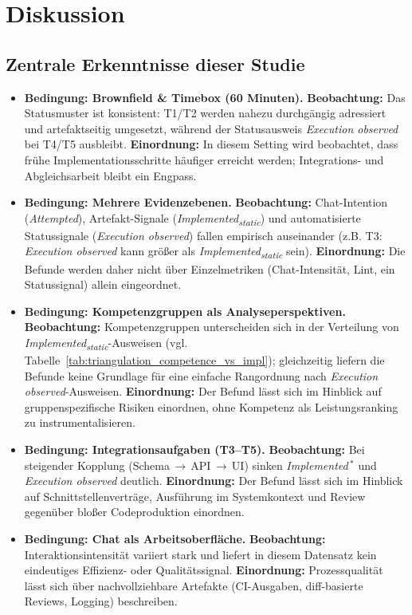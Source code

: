 \chapter{Diskussion}
\label{chap:discussion}

\section{Zentrale Erkenntnisse dieser Studie}
\label{sec:discussion_core_findings}

\begin{itemize}
	\item \textbf{Bedingung: Brownfield \& Timebox (60 Minuten).} \textbf{Beobachtung:} Das Statusmuster ist konsistent: T1/T2 werden nahezu durchg\"angig adressiert und artefaktseitig umgesetzt, w\"ahrend der Statusausweis \textit{Execution observed} bei T4/T5 ausbleibt. \textbf{Einordnung:} In diesem Setting wird beobachtet, dass fr\"uhe Implementationsschritte h\"aufiger erreicht werden; Integrations- und Abgleichsarbeit bleibt ein Engpass.
	\item \textbf{Bedingung: Mehrere Evidenzebenen.} \textbf{Beobachtung:} Chat-Intention (\textit{Attempted}), Artefakt-Signale (\textit{Implemented\textsubscript{static}}) und automatisierte Statussignale (\textit{Execution observed}) fallen empirisch auseinander (z.B. T3: \textit{Execution observed} kann gr\"o\ss er als \textit{Implemented\textsubscript{static}} sein). \textbf{Einordnung:} Die Befunde werden daher nicht \"uber Einzelmetriken (Chat-Intensit\"at, Lint, ein Statussignal) allein eingeordnet.
	\item \textbf{Bedingung: Kompetenzgruppen als Analyseperspektiven.} \textbf{Beobachtung:} Kompetenzgruppen unterscheiden sich in der Verteilung von \textit{Implemented\textsubscript{static}}-Ausweisen (vgl. Tabelle~\ref{tab:triangulation_competence_vs_impl}); gleichzeitig liefern die Befunde keine Grundlage f\"ur eine einfache Rangordnung nach \textit{Execution observed}-Ausweisen. \textbf{Einordnung:} Der Befund l\"asst sich im Hinblick auf gruppenspezifische Risiken einordnen, ohne Kompetenz als Leistungsranking zu instrumentalisieren.
	\item \textbf{Bedingung: Integrationsaufgaben (T3--T5).} \textbf{Beobachtung:} Bei steigender Kopplung (Schema\,$\rightarrow$\,API\,$\rightarrow$\,UI) sinken \textit{Implemented}\,$^\ast$ und \textit{Execution observed} deutlich. \textbf{Einordnung:} Der Befund l\"asst sich im Hinblick auf Schnittstellenvertr\"age, Ausf\"uhrung im Systemkontext und Review gegen\"uber blo\ss er Codeproduktion einordnen.
	\item \textbf{Bedingung: Chat als Arbeitsoberfl\"ache.} \textbf{Beobachtung:} Interaktionsintensit\"at variiert stark und liefert in diesem Datensatz kein eindeutiges Effizienz- oder Qualit\"atssignal. \textbf{Einordnung:} Prozessqualit\"at l\"asst sich \"uber nachvollziehbare Artefakte (CI-Ausgaben, diff-basierte Reviews, Logging) beschreiben.
\end{itemize}

